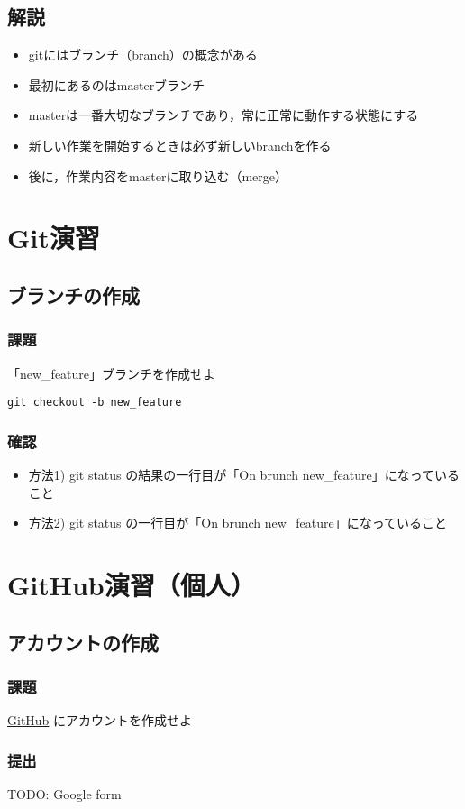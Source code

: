 \documentclass{bxjsarticle}
\begin{document}
\subsection{解説}
\label{sec-5-1}
\begin{itemize}
\item gitにはブランチ（branch）の概念がある
\item 最初にあるのはmasterブランチ
\item masterは一番大切なブランチであり，常に正常に動作する状態にする
\item 新しい作業を開始するときは必ず新しいbranchを作る
\item 後に，作業内容をmasterに取り込む（merge）
\end{itemize}
\section{Git演習}
\label{sec-6}
\subsection{ブランチの作成}
\label{sec-6-1}
\subsubsection{課題}
\label{sec-6-1-1}

「new\_feature」ブランチを作成せよ

\begin{verbatim}
git checkout -b new_feature
\end{verbatim}

\subsubsection{確認}
\label{sec-6-1-2}
\begin{itemize}
\item 方法1) git status の結果の一行目が「On brunch new\_feature」になっていること
\item 方法2) git status の一行目が「On brunch new\_feature」になっていること
\end{itemize}


\section{GitHub演習（個人）}
\label{sec-7}
\subsection{アカウントの作成}
\label{sec-7-1}
\subsubsection{課題}
\label{sec-7-1-1}
\href{https://github.com/}{GitHub} にアカウントを作成せよ
\subsubsection{提出}
\label{sec-7-1-2}
TODO: Google form
\end{document}
